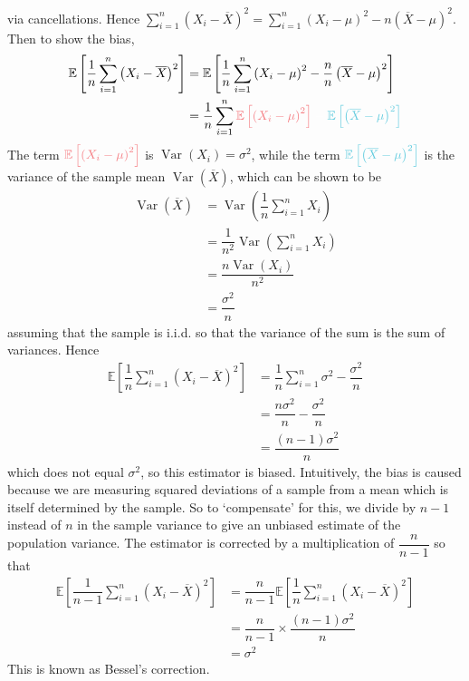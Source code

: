 \documentclass[11pt]{report} %
\begin{document}
via cancellations. Hence $\sum_{i = 1}^{n}{\left(X_i - \overline{X}\right)^{2}} = \sum_{i = 1}^{n}{\left(X_i - \mu\right)^{2}} - n\left(\overline{X} - \mu\right)^{2}$. Then to show the bias,
\begin{align}
\mathbb{E}\left[\dfrac{1}{n}\sum_{i = 1}^{n}{\left(X_{i} - \overline{X}\right)^{2}}\right] &= \mathbb{E}\left[\dfrac{1}{n}\sum_{i = 1}^{n}{\left(X_i - \mu\right)^{2}} - \dfrac{n}{n}\left(\overline{X} - \mu\right)^{2}\right] \\
&= \dfrac{1}{n}\sum_{i = 1}^{n}\red{\mathbb{E}\left[\left(X_{i} - \mu\right)^{2}\right]}\black - \blue\mathbb{E}\left[\left(\overline{X} - \mu\right)^{2}\right]\black
\end{align}
The term $\red{\mathbb{E}\left[\left(X_{i} - \mu\right)^{2}\right]}\black$ is $\operatorname{Var}\left(X_{i}\right) = \sigma^{2}$, while the term $\blue\mathbb{E}\left[\left(\overline{X} - \mu\right)^{2}\right]\black$ is the variance of the sample mean $\operatorname{Var}\left(\overline{X}\right)$, which can be shown to be
\begin{align}
\operatorname{Var}\left(\overline{X}\right) &= \operatorname{Var}\left(\dfrac{1}{n}\sum_{i = 1}^{n}X_{i}\right) \\
&= \dfrac{1}{n^{2}}\operatorname{Var}\left(\sum_{i = 1}^{n}X_{i}\right) \\
&= \dfrac{n\operatorname{Var}\left(X_{i}\right)}{n^{2}} \\
&= \dfrac{\sigma^{2}}{n}
\end{align}
assuming that the sample is i.i.d. so that the variance of the sum is the sum of variances. Hence
\begin{align}
\mathbb{E}\left[\dfrac{1}{n}\sum_{i = 1}^{n}{\left(X_{i} - \overline{X}\right)^{2}}\right] &= \dfrac{1}{n}\sum_{i = 1}^{n}\sigma^{2} - \dfrac{\sigma^{2}}{n} \\
&= \dfrac{n\sigma^{2}}{n} - \dfrac{\sigma^{2}}{n} \\
&= \dfrac{\left(n - 1\right)\sigma^{2}}{n}
\end{align}
which does not equal $\sigma^{2}$, so this estimator is biased. Intuitively, the bias is caused because we are measuring squared deviations of a sample from a mean which is itself determined by the sample. So to `compensate' for this, we divide by $n - 1$ instead of $n$ in the sample variance to give an unbiased estimate of the population variance. The estimator is corrected by a multiplication of $\dfrac{n}{n - 1}$ so that
\begin{align}
\mathbb{E}\left[\dfrac{1}{n - 1}\sum_{i = 1}^{n}{\left(X_{i} - \overline{X}\right)^{2}}\right] &= \dfrac{n}{n - 1}\mathbb{E}\left[\dfrac{1}{n}\sum_{i = 1}^{n}{\left(X_{i} - \overline{X}\right)^{2}}\right] \\
&= \dfrac{n}{n - 1} \times \dfrac{\left(n - 1\right)\sigma^{2}}{n} \\
&= \sigma^{2}
\end{align}
This is known as Bessel's correction.
\end{document}
